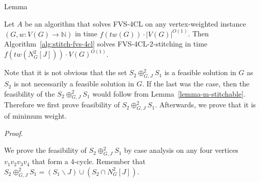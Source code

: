 \begin{mydefinition}{Lemma}
    \label{lemma-stictch-fvs-4cl}

    \noindent Let $A$ be an algorithm that solves FVS-4CL on any vertex-weighted instance $(G, w:V(G) \to \mathbb{N})$
    in time $f(tw(G)) \cdot |V(G)|^{O(1)}$. Then Algorithm~\ref{alg:stitch-fvs-4cl} solves 
    FVS-4CL-2-stitching in time $f(tw(N^{2}_{G}[J])) \cdot V(G)^{O(1)}$.
    
\end{mydefinition}

Note that it is not obvious that the set $S_2 \oplus^{2}_{G,J} S_1$ is a feasible solution in $G$ as $S_2$ is not 
necessarily a feasible solution in $G$. If the last was the case, then the feasibility of the 
$S_2 \oplus^{2}_{G,J} S_1$ would follow from Lemma~\ref{lemma-m-stitchable}. Therefore we first prove 
feasibility of $S_2 \oplus^{2}_{G,J} S_1$. Afterwards, we prove that it is of minimum weight.

\textit{Proof}.

We prove the feasibility of $S_2 \oplus^{2}_{G,J} S_1$ by case analysis on any four vertices $v_1 v_2 v_3 v_4$
that form a 4-cycle. Remember that $S_2 \oplus^{2}_{G,J} S_1 = (S_1 \backslash J) \cup (S_2 \cap N^{2}_{G}[J])$.

